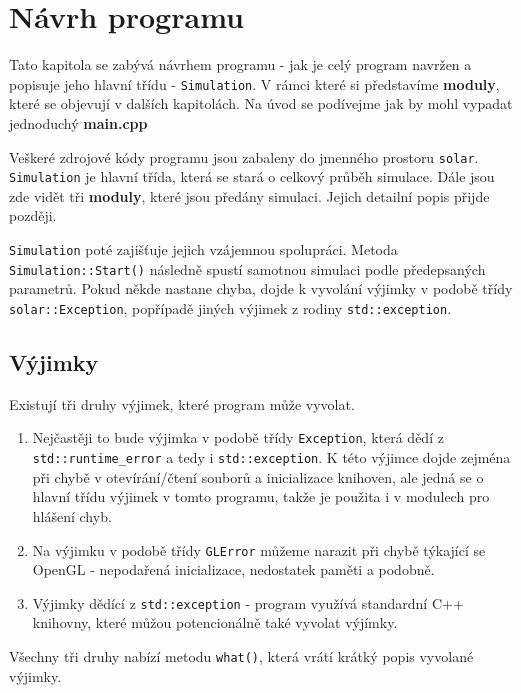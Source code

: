 
\chapter{Návrh programu}
\label{chap:implementace}
Tato kapitola se zabývá návrhem programu - jak je celý program navržen a popisuje jeho hlavní třídu - \texttt{Simulation}. V rámci které si představíme \textbf{moduly}, které se objevují v dalších kapitolách.
Na úvod se podívejme jak by mohl vypadat jednoduchý \textbf{main.cpp} 


Veškeré zdrojové kódy programu jsou zabaleny do jmenného prostoru \texttt{solar}. \texttt{Simulation} je hlavní třída, která se stará o celkový průběh simulace. Dále jsou zde vidět tři \textbf{moduly}, které jsou předány simulaci. Jejich detailní popis přijde později.

\texttt{Simulation} poté zajišťuje jejich vzájemnou spolupráci. Metoda \texttt{Simulation::Start()} následně spustí samotnou simulaci podle předepsaných parametrů.
Pokud někde nastane chyba, dojde k vyvolání výjimky v podobě třídy \texttt{solar::Exception}, popřípadě jiných výjimek z rodiny \texttt{std::exception}.




\section{Výjimky}
Existují tři druhy výjimek, které program může vyvolat.
\begin{enumerate}
	\item Nejčastěji to bude výjimka v podobě třídy \texttt{Exception}, která dědí 
	z \texttt{std::runtime\_error} a tedy i \texttt{std::exception}. K této výjimce dojde zejména při chybě v otevírání/čtení souborů a inicializace knihoven, ale jedná se o hlavní třídu výjimek v tomto programu, takže je použita i v modulech pro hlášení chyb.
	\item Na výjimku v podobě třídy \texttt{GLError} můžeme narazit při chybě týkající se OpenGL - nepodařená inicializace, nedostatek paměti a podobně.
\item Výjimky dědící z \texttt{std::exception} - program využívá standardní C++ knihovny, které můžou potencionálně také vyvolat výjímky.
\end{enumerate}
Všechny tři druhy nabízí metodu \texttt{what()}, která vrátí krátký popis vyvolané výjimky.